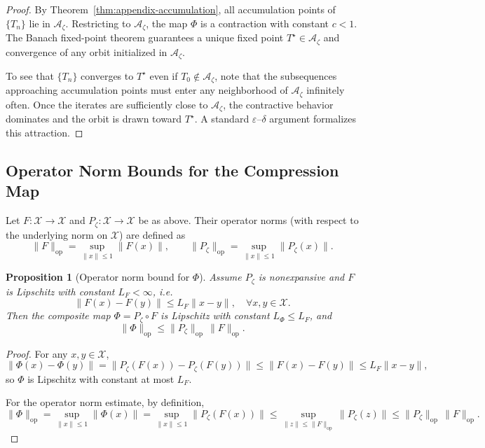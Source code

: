 \documentclass[11pt]{article}
\theoremstyle{definition}
\theoremstyle{plain}
\newtheorem{proposition}[definition]{Proposition}
\theoremstyle{remark}
\newcommand{\Azet}{\mathcal{A}_\zeta}
\newcommand{\Xc}{\mathcal{X}}
\begin{document}
\begin{proof}
By Theorem~\ref{thm:appendix-accumulation}, all accumulation points of $\{T_n\}$ lie in $\Azet$. Restricting to $\Azet$, the map $\Phi$ is a contraction with constant $c<1$. The Banach fixed-point theorem guarantees a unique fixed point $T^\star\in\Azet$ and convergence of any orbit initialized in $\Azet$.

To see that $\{T_n\}$ converges to $T^\star$ even if $T_0\notin\Azet$, note that the subsequences approaching accumulation points must enter any neighborhood of $\Azet$ infinitely often. Once the iterates are sufficiently close to $\Azet$, the contractive behavior dominates and the orbit is drawn toward $T^\star$. A standard $\varepsilon$--$\delta$ argument formalizes this attraction.
\end{proof}

\subsection{Operator Norm Bounds for the Compression Map}

Let $F:\Xc\to\Xc$ and $P_\zeta:\Xc\to\Xc$ be as above. Their operator norms (with respect to the underlying norm on $\Xc$) are defined as
\[
\|F\|_{\mathrm{op}} = \sup_{\|x\|\le 1} \|F(x)\|,\qquad \|P_\zeta\|_{\mathrm{op}} = \sup_{\|x\|\le 1} \|P_\zeta(x)\|.
\]

\begin{proposition}[Operator norm bound for $\Phi$]
\label{prop:appendix-operator-norm}
Assume $P_\zeta$ is nonexpansive and $F$ is Lipschitz with constant $L_F<\infty$, i.e.
\[
\|F(x)-F(y)\| \le L_F \|x-y\|,\quad \forall x,y\in\Xc.
\]
Then the composite map $\Phi=P_\zeta\circ F$ is Lipschitz with constant $L_\Phi\le L_F$, and
\[
\|\Phi\|_{\mathrm{op}} \le \|P_\zeta\|_{\mathrm{op}} \,\|F\|_{\mathrm{op}}.
\]
\end{proposition}

\begin{proof}
For any $x,y\in\Xc$,
\[
\|\Phi(x)-\Phi(y)\| = \|P_\zeta(F(x)) - P_\zeta(F(y))\| \le \|F(x)-F(y)\| \le L_F \|x-y\|,
\]
so $\Phi$ is Lipschitz with constant at most $L_F$.

For the operator norm estimate, by definition,
\[
\|\Phi\|_{\mathrm{op}} = \sup_{\|x\|\le 1} \|\Phi(x)\| = \sup_{\|x\|\le 1} \|P_\zeta(F(x))\| \le \sup_{\|z\|\le \|F\|_{\mathrm{op}}} \|P_\zeta(z)\| \le \|P_\zeta\|_{\mathrm{op}} \,\|F\|_{\mathrm{op}}.
\]
\end{proof}
\end{document}
